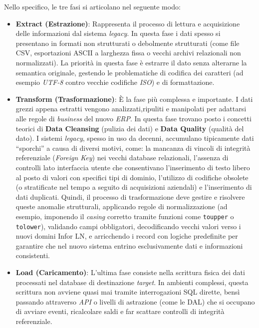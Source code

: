 Nello specifico, le tre fasi si articolano nel seguente modo:
\begin{itemize}
    \item \textbf{Extract (Estrazione)}: Rappresenta il processo di lettura e acquisizione delle informazioni dal sistema \textit{legacy}.
    In questa fase i dati spesso si presentano in formati non strutturati o debolmente strutturati (come file CSV, esportazioni ASCII a larghezza fissa o vecchi archivi
    relazionali non normalizzati).
    La priorità in questa fase è estrarre il dato senza alterarne la semantica originale, gestendo le problematiche di codifica
    dei caratteri (ad esempio \textit{UTF-8} contro vecchie codifiche \textit{ISO}) e di formattazione.
    \item \textbf{Transform (Trasformazione)}: È la fase più complessa e importante.
    I dati grezzi appena estratti vengono analizzati,ripuliti e manipolati per adattarsi alle regole di \textit{business} del nuovo \textit{ERP}.
    In questa fase trovano posto i concetti teorici di \textbf{Data Cleansing} (pulizia dei dati) e \textbf{Data Quality} (qualità del dato).
    I sistemi \textit{legacy}, spesso in uso da decenni, accumulano tipicamente dati \enquote{sporchi} a causa di diversi motivi, come:
    la mancanza di vincoli di integrità referenziale (\textit{Foreign Key}) nei vecchi database relazionali, l'assenza di controlli lato interfaccia 
    utente che consentivano l'inserimento di testo libero al posto di valori con specifici tipi di dominio, l'utilizzo di codifiche obsolete (o stratificate nel tempo a seguito di acquisizioni aziendali) 
    e l'inserimento di dati duplicati.
    Quindi, il processo di trasformazione deve gestire e risolvere queste anomalie strutturali, applicando regole di normalizzazione (ad esempio, imponendo il \textit{casing} corretto tramite funzioni come \texttt{toupper} o \texttt{tolower}),
    validando campi obbligatori, decodificando vecchi valori verso i nuovi domini Infor LN, e arricchendo i record con logiche predefinite per garantire che nel nuovo sistema entrino
    esclusivamente dati e informazioni consistenti.
    \item \textbf{Load (Caricamento)}: L'ultima fase consiste nella scrittura fisica dei dati processati nel database di destinazione \textit{target}.
    In ambienti complessi, questa scrittura non avviene quasi mai tramite interrogazioni SQL dirette, bensì passando attraverso \textit{API} o livelli di astrazione (come le DAL) che si
    occupano di avviare eventi, ricalcolare saldi e far scattare controlli di integrità referenziale.
\end{itemize}

